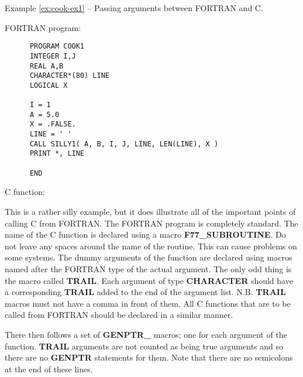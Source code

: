 \label{ex:cook-ex1}
\begin{center}
Example \ref{ex:cook-ex1} -- Passing arguments between FORTRAN and C.
\end{center}
\nopagebreak[4]
FORTRAN program:
{\small \begin{verbatim}
      PROGRAM COOK1
      INTEGER I,J
      REAL A,B
      CHARACTER*(80) LINE
      LOGICAL X

      I = 1
      A = 5.0
      X = .FALSE.
      LINE = ' '
      CALL SILLY1( A, B, I, J, LINE, LEN(LINE), X )
      PRINT *, LINE

      END
\end{verbatim} }
C function:

This is a rather silly example, but it does illustrate all of the important
points of calling C from FORTRAN. The FORTRAN program is completely standard.
The name of the C function is declared using a macro {\bf F77\_\-SUBROUTINE}.
Do not leave any spaces around the name of the routine. This can cause problems
on some systems. The dummy arguments of the function are declared using macros
named after the FORTRAN type of the actual argument. The only odd thing is the
macro called {\bf TRAIL}. Each argument of type {\bf CHARACTER} should have a
corresponding {\bf TRAIL} added to the end of the argument list. N.B. {\bf
TRAIL} macros must not have a comma in front of them. All C functions that are
to be called from FORTRAN should be declared in a similar manner.

There then follows a set of {\bf GENPTR\_} macros; one for each
argument of the function. {\bf TRAIL} arguments are not counted as being true
arguments and so there are no {\bf GENPTR} statements for them. Note that there
are no semicolons at the end of these lines.

